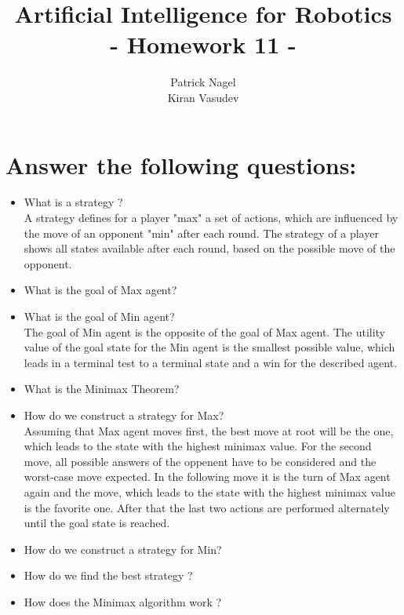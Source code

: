 \documentclass[11pt]{article}
\title{\textbf{Artificial Intelligence for Robotics\\
- Homework 11} -
}
\author{Patrick Nagel\\Kiran Vasudev}
\date{ }
\begin{document}
\maketitle

\section{Answer the following questions:}
\begin{itemize}
	\item What is a strategy ?\\
	A strategy defines for a player "max" a set of actions, which are influenced by the move of an opponent "min" after each round. The strategy of a player shows all states available after each round, based on the possible move of the opponent. 
	\item What is the goal of Max agent?\\
	
	\item What is the goal of Min agent?\\
	The goal of Min agent is the opposite of the goal of Max agent. The utility value of the goal state for the Min agent is the smallest possible value, which leads in a terminal test to a terminal state and a win for the described agent.
	\item What is the Minimax Theorem?\\
	
	\item How do we construct a strategy for Max?\\
	Assuming that Max agent moves first, the best move at root will be the one, which leads to the state with the highest minimax value. For the second move, all possible answers of the oppenent have to be considered and the worst-case move expected. In the following move it is the turn of Max agent again and the move, which leads to the state with the highest minimax value is the favorite one. After that the last two actions are performed alternately until the goal state is reached.
	
	\item How do we construct a strategy for Min?\\
	
	\item How do we find the best strategy ?\\
	
	\item How does the Minimax algorithm work ?\\
	

\end{itemize}
\end{document}
